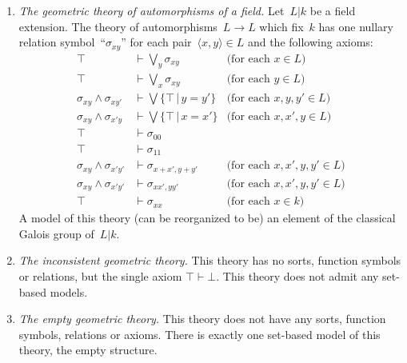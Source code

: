 \documentclass{ws-rv9x6}
\begin{document}
{\begin{enumerate}
\item \emph{The geometric theory of automorphisms of a field.}\label{par:theory-automorphisms}
Let~$L|k$ be a field
extension. The theory of automorphisms~$L \to L$ which fix~$k$ has
one nullary relation symbol~``$\sigma_{xy}$'' for each pair~$\langle x,y
\rangle \in L$ and the following axioms:
\begin{align*}
  \top &\vdash \bigvee_y \sigma_{xy} & \text{(for each~$x \in L$)} \\
  \top &\vdash \bigvee_x \sigma_{xy} & \text{(for each~$y \in L$)} \\
  \sigma_{xy} \wedge \sigma_{xy'} &\vdash \bigvee\{ \top \,|\, y = y' \} & \text{(for each~$x,y,y' \in L$)} \\
  \sigma_{xy} \wedge \sigma_{x'y} &\vdash \bigvee\{ \top \,|\, x = x' \} & \text{(for each~$x,x',y \in L$)} \\
  \top &\vdash \sigma_{00} \\
  \top &\vdash \sigma_{11} \\
  \sigma_{xy} \wedge \sigma_{x'y'} &\vdash \sigma_{x+x',y+y'} & \text{(for each~$x,x',y,y' \in L$)} \\
  \sigma_{xy} \wedge \sigma_{x'y'} &\vdash \sigma_{xx',yy'} & \text{(for each~$x,x',y,y' \in L$)} \\
  \top &\vdash \sigma_{xx} & \text{(for each~$x \in k$)}
\end{align*}
A model of this theory (can be reorganized to be) an element of the classical
Galois group of~$L|k$.

\item \emph{The inconsistent geometric theory.} This theory has no sorts,
function symbols or relations, but the single axiom $\top \vdash \bot$.
This theory does not admit any set-based models.

\item \emph{The empty geometric theory.} This theory does not have any sorts,
function symbols, relations or axioms. There is exactly one set-based model of
this theory, the empty structure.
\end{enumerate}

}
\end{document}
